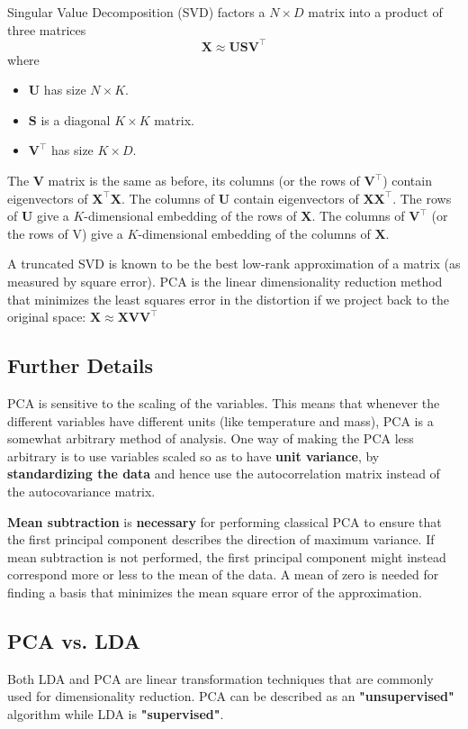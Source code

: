 \documentclass[a3paper, 12pt]{book} %
\begin{document}
Singular Value Decomposition (SVD) factors a $N\times D$ matrix into a product of three matrices
$$\mathbf{X} \approx \mathbf{U}\mathbf{S}\mathbf{V}^{\top}$$
where
\begin{itemize}
\item $\mathbf{U}$ has size $N\times K$.
\item $\mathbf{S}$ is a diagonal $K \times K$ matrix.
\item $\mathbf{V}^\top$ has size $K \times D$.
\end{itemize}
The $\mathbf{V}$ matrix is the same as before, its columns (or the rows of $\mathbf{V}^\top$) contain eigenvectors of $\mathbf{X}^\top \mathbf{X}$. The columns of $\mathbf{U}$ contain eigenvectors of $\mathbf{X}\mathbf{X}^\top$. The rows of $\mathbf{U}$ give a $K$-dimensional embedding of the rows of $\mathbf{X}$. The columns of $\mathbf{V}^\top$ (or the rows of V) give a $K$-dimensional embedding of the columns of $\mathbf{X}$. 

A truncated SVD is known to be the best low-rank approximation of a matrix (as measured by square error). PCA is the linear dimensionality reduction method that minimizes the least squares error in the distortion if we project back to the original space: $\mathbf{X}\approx \mathbf{X}\mathbf{V}\mathbf{V}^\top$

\subsection{Further Details}
PCA is sensitive to the scaling of the variables. This means that whenever the different variables have different units (like temperature and mass), PCA is a somewhat arbitrary method of analysis. One way of making the PCA less arbitrary is to use variables scaled so as to have \textbf{unit variance}, by \textbf{standardizing the data} and hence use the autocorrelation matrix instead of the autocovariance matrix.

\textbf{Mean subtraction} is \textbf{necessary} for performing classical PCA to ensure that the first principal component describes the direction of maximum variance. If mean subtraction is not performed, the first principal component might instead correspond more or less to the mean of the data. A mean of zero is needed for finding a basis that minimizes the mean square error of the approximation.  

\subsection{PCA vs. LDA}
Both LDA and PCA are linear transformation techniques that are commonly used for dimensionality reduction. PCA can be described as an \textbf{"unsupervised"} algorithm while LDA is \textbf{"supervised"}.
\end{document}
